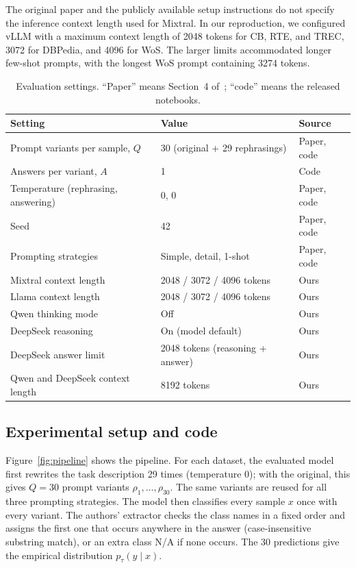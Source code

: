 \par\medskip

The original paper and the publicly available setup
instructions do not specify the inference context
length used for Mixtral. In our reproduction, we
configured vLLM with a maximum context length of
2048 tokens for CB, RTE, and TREC, 3072 for
DBPedia, and 4096 for WoS. The larger limits
accommodated longer few-shot prompts, with the
longest WoS prompt containing 3274 tokens. 


\begin{table}[H]
  \centering
  \small
  \caption{Evaluation settings. ``Paper'' means Section~4 of~\cite{Errica:2025};
  ``code'' means the released notebooks.}
  \label{tab:hparams}
  \setlength{\tabcolsep}{4pt}
  \begin{tabular}{lll}
    \toprule
    Setting & Value & Source \\
    \midrule
    Prompt variants per sample, $Q$ & 30 (original + 29 rephrasings) & Paper, code \\
    Answers per variant, $A$ & 1 & Code \\
    Temperature (rephrasing, answering) & 0, 0 & Paper, code \\
    Seed & 42 & Paper, code \\
    Prompting strategies & Simple, detail, 1-shot & Paper, code \\
    Mixtral context length & 2048 / 3072 / 4096 tokens & Ours \\
    Llama context length & 2048 / 3072 / 4096 tokens & Ours \\
    Qwen thinking mode & Off & Ours \\
    DeepSeek reasoning & On (model default) & Ours \\
    DeepSeek answer limit & 2048 tokens (reasoning + answer) & Ours \\
    Qwen and DeepSeek context length & 8192 tokens & Ours \\
    \bottomrule
  \end{tabular}
\end{table}


\subsection{Experimental setup and code}
\label{sec:setup}
Figure~\ref{fig:pipeline} shows the pipeline. For each dataset, the evaluated
model first rewrites the task description 29 times (temperature 0); with the
original, this gives $Q = 30$ prompt variants $\rho_1,\dots,\rho_{30}$. The
same variants are reused for all three prompting strategies. The model then
classifies every sample $x$ once with every variant. The authors' extractor
checks the class names in a fixed order and assigns the first one that occurs
anywhere in the answer (case-insensitive substring match), or an extra class
N/A if none occurs. The 30 predictions give the empirical
distribution $p_\tau(y \mid x)$.

